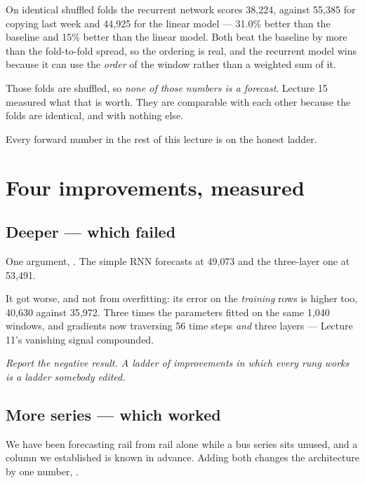 \documentclass[11pt,a4paper]{article}
\begin{document}
On identical shuffled folds the recurrent network scores 38{,}224, against
55{,}385 for copying last week and 44{,}925 for the linear model --- 31.0\%
better than the baseline and 15\% better than the linear model. Both beat the
baseline by more than the fold-to-fold spread, so the ordering is real, and the
recurrent model wins because it can use the \emph{order} of the window rather
than a weighted sum of it.

\begin{failbox}[title={Failure condition --- and the assumption, stated rather than left implied}]
Those folds are shuffled, so \emph{none of those numbers is a forecast}.
Lecture 15 measured what that is worth. They are comparable with each other
because the folds are identical, and with nothing else.

Every forward number in the rest of this lecture is on the honest ladder.
\end{failbox}

\section{Four improvements, measured}

\subsection{Deeper --- which failed}

One argument, . The simple RNN forecasts at 49{,}073 and
the three-layer one at 53{,}491.

It got worse, and not from overfitting: its error on the \emph{training} rows
is higher too, 40{,}630 against 35{,}972. Three times the parameters fitted on
the same 1{,}040 windows, and gradients now traversing 56 time steps
\emph{and} three layers --- Lecture 11's vanishing signal compounded.

\emph{Report the negative result. A ladder of improvements in which every rung
works is a ladder somebody edited.}

\subsection{More series --- which worked}

We have been forecasting rail from rail alone while a bus series sits unused,
and a  column we established is known in advance. Adding both
changes the architecture by one number, .
\end{document}
